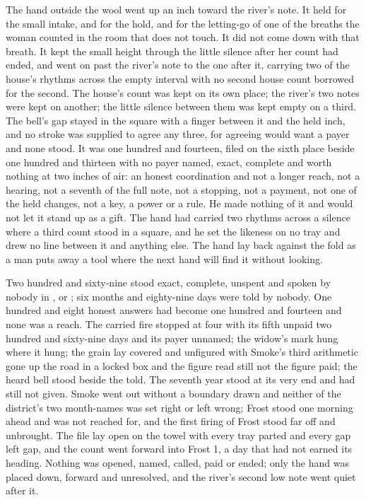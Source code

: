 The hand outside the wool went up an inch toward the river's note. It held for the small intake, and for the hold, and for the letting-go of one of the breaths the woman counted in the room that does not touch. It did not come down with that breath. It kept the small height through the little silence after her count had ended, and went on past the river's note to the one after it, carrying two of the house's rhythms across the empty interval with no second house count borrowed for the second. The house's count was kept on its own place; the river's two notes were kept on another; the little silence between them was kept empty on a third. The bell's gap stayed in the square with a finger between it and the held inch, and no stroke was supplied to agree any three, for agreeing would want a payer and none stood. It was one hundred and fourteen, filed on the sixth place beside one hundred and thirteen with no payer named, exact, complete and worth nothing at two inches of air: an honest coordination and not a longer reach, not a hearing, not a seventh of the full note, not a stopping, not a payment, not one of the held changes, not a key, a power or a rule. He made nothing of it and would not let it stand up as a gift. The hand had carried two rhythms across a silence where a third count stood in a square, and he set the likeness on no tray and drew no line between it and anything else. The hand lay back against the fold as a man puts away a tool where the next hand will find it without looking.

Two hundred and sixty-nine stood exact, complete, unspent and spoken by nobody in ,  or ; six months and eighty-nine days were told by nobody. One hundred and eight honest answers had become one hundred and fourteen and none was a reach. The carried fire stopped at four with its fifth unpaid two hundred and sixty-nine days and its payer unnamed; the widow's mark hung where it hung; the grain lay covered and unfigured with Smoke's third arithmetic gone up the road in a locked box and the figure read still not the figure paid; the heard bell stood beside the told. The seventh year stood at its very end and had still not given. Smoke went out without a boundary drawn and neither of the district's two month-names was set right or left wrong; Frost stood one morning ahead and was not reached for, and the first firing of Frost stood far off and unbrought. The file lay open on the towel with every tray parted and every gap left gap, and the count went forward into Frost 1, a day that had not earned its heading. Nothing was opened, named, called, paid or ended; only the hand was placed down, forward and unresolved, and the river's second low note went quiet after it.
